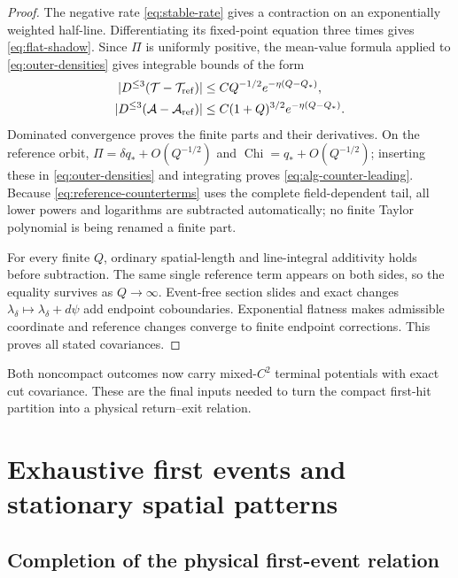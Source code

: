 \documentclass[11pt,reqno]{amsart}
\numberwithin{equation}{section}
\theoremstyle{definition}
\theoremstyle{remark}
\newcommand{\Chi}{\operatorname{Chi}}
\begin{document}
\begin{proof}
The negative rate \eqref{eq:stable-rate} gives a contraction on an
exponentially weighted half-line.  Differentiating its fixed-point equation
three times gives \eqref{eq:flat-shadow}.  Since $\Pi$ is uniformly positive,
the mean-value formula applied to \eqref{eq:outer-densities} gives integrable
bounds of the form
\begin{equation}\label{eq:outer-density-diff}
 \begin{aligned}
  |D^{\le3}(\mathcal T-\mathcal T_{\rm ref})|
   &\le CQ^{-1/2}e^{-\eta(Q-Q_*)},\\
  |D^{\le3}(\mathcal A-\mathcal A_{\rm ref})|
   &\le C(1+Q)^{3/2}e^{-\eta(Q-Q_*)}.
 \end{aligned}
\end{equation}
Dominated convergence proves the finite parts and their derivatives.  On the
reference orbit, $\Pi=\delta q_*+O(Q^{-1/2})$ and
$\Chi=q_*+O(Q^{-1/2})$; inserting these in
\eqref{eq:outer-densities} and integrating proves
\eqref{eq:alg-counter-leading}.  Because
\eqref{eq:reference-counterterms} uses the complete field-dependent tail,
all lower powers and logarithms are subtracted automatically; no finite
Taylor polynomial is being renamed a finite part.

For every finite $Q$, ordinary spatial-length and line-integral additivity
holds before subtraction.  The same single reference term appears on both
sides, so the equality survives as $Q\to\infty$.  Event-free section slides
and exact changes $\lambda_\delta\mapsto\lambda_\delta+d\psi$ add endpoint
coboundaries.  Exponential flatness makes admissible coordinate and reference
changes converge to finite endpoint corrections.  This proves all stated
covariances.
\end{proof}

\noindent
Both noncompact outcomes now carry mixed-$C^2$ terminal potentials with exact
cut covariance.  These are the final inputs needed to turn the compact
first-hit partition into a physical return--exit relation.

\section{Exhaustive first events and stationary spatial patterns}\label{sec:coding}

\subsection{Completion of the physical first-event relation}
\end{document}
